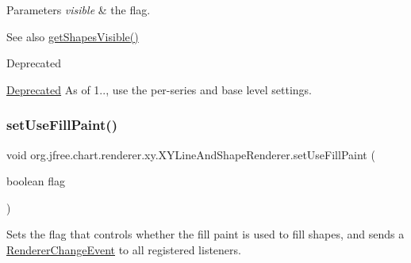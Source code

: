 \begin{DoxyParams}{Parameters}
{\em visible} & the flag.\\
\hline
\end{DoxyParams}
\begin{DoxySeeAlso}{See also}
\mbox{\hyperlink{classorg_1_1jfree_1_1chart_1_1renderer_1_1xy_1_1_x_y_line_and_shape_renderer_a25d79c5f041107df31533fbc2b9f6d62}{get\+Shapes\+Visible()}}
\end{DoxySeeAlso}
\begin{DoxyRefDesc}{Deprecated}
\item[\mbox{\hyperlink{deprecated__deprecated000247}{Deprecated}}]As of 1.., use the per-\/series and base level settings. \end{DoxyRefDesc}
\mbox{\label{classorg_1_1jfree_1_1chart_1_1renderer_1_1xy_1_1_x_y_line_and_shape_renderer_a10b363b55780c53c8aff57f0f4bcc3f6}} 
\subsubsection{\texorpdfstring{set\+Use\+Fill\+Paint()}{setUseFillPaint()}}
{\footnotesize\ttfamily void org.\+jfree.\+chart.\+renderer.\+xy.\+X\+Y\+Line\+And\+Shape\+Renderer.\+set\+Use\+Fill\+Paint (\begin{DoxyParamCaption}\item[{boolean}]{flag }\end{DoxyParamCaption})}

Sets the flag that controls whether the fill paint is used to fill shapes, and sends a \mbox{\hyperlink{}{Renderer\+Change\+Event}} to all registered listeners.


